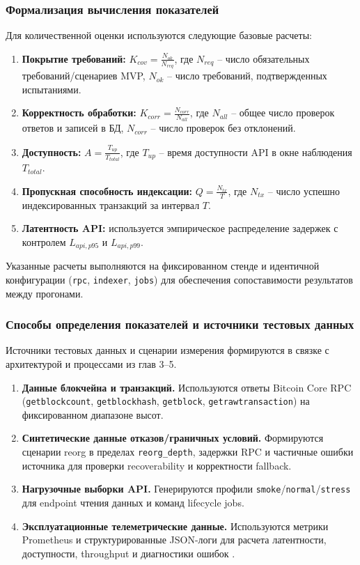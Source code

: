 ﻿\documentclass[14pt,a4paper]{extarticle}
\begin{document}
\subsubsection{Формализация вычисления показателей}
\noindent Для количественной оценки используются следующие базовые расчеты:
\begin{enumerate}
  \item \textbf{Покрытие требований:} $K_{cov}=\frac{N_{ok}}{N_{req}}$, где $N_{req}$ -- число обязательных требований/сценариев MVP, $N_{ok}$ -- число требований, подтвержденных испытаниями.
  \item \textbf{Корректность обработки:} $K_{corr}=\frac{N_{corr}}{N_{all}}$, где $N_{all}$ -- общее число проверок ответов и записей в БД, $N_{corr}$ -- число проверок без отклонений.
  \item \textbf{Доступность:} $A=\frac{T_{up}}{T_{total}}$, где $T_{up}$ -- время доступности API в окне наблюдения $T_{total}$.
  \item \textbf{Пропускная способность индексации:} $Q=\frac{N_{tx}}{T}$, где $N_{tx}$ -- число успешно индексированных транзакций за интервал $T$.
  \item \textbf{Латентность API:} используется эмпирическое распределение задержек с контролем $L_{api,p95}$ и $L_{api,p99}$.
\end{enumerate}
\noindent Указанные расчеты выполняются на фиксированном стенде и идентичной конфигурации (\texttt{rpc}, \texttt{indexer}, \texttt{jobs}) для обеспечения сопоставимости результатов между прогонами.

\subsubsection{Способы определения показателей и источники тестовых данных}
\noindent Источники тестовых данных и сценарии измерения формируются в связке с архитектурой и процессами из глав 3--5.
\begin{enumerate}
  \item \textbf{Данные блокчейна и транзакций.} Используются ответы Bitcoin Core RPC (\texttt{getblockcount}, \texttt{getblockhash}, \texttt{getblock}, \texttt{getrawtransaction}) на фиксированном диапазоне высот.
  \item \textbf{Синтетические данные отказов/граничных условий.} Формируются сценарии reorg в пределах \texttt{reorg\_depth}, задержки RPC и частичные ошибки источника для проверки recoverability и корректности fallback.
  \item \textbf{Нагрузочные выборки API.} Генерируются профили \texttt{smoke}/\texttt{normal}/\texttt{stress} для endpoint чтения данных и команд lifecycle jobs.
  \item \textbf{Эксплуатационные телеметрические данные.} Используются метрики Prometheus и структурированные JSON-логи для расчета латентности, доступности, throughput и диагностики ошибок \cite{src_prometheus}.
\end{enumerate}
\end{document}
